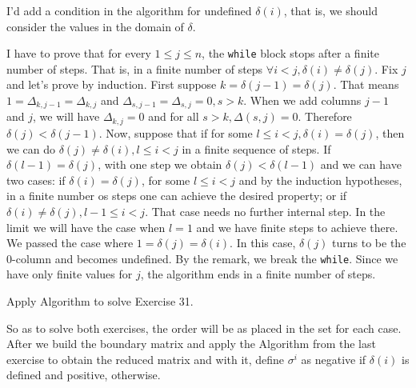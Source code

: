 \begin{remark}
    I'd add a condition in the algorithm for undefined $\delta(i)$, that is,
    we should consider the values in the domain of $\delta$.
\end{remark}

I have to prove that for every $1 \le j \le n$, the \texttt{while} block stops
after a finite number of steps. That is, in a finite number of steps $\forall
i < j, \delta(i) \neq \delta(j)$. Fix $j$ and let's prove by induction. First
suppose $k = \delta(j-1) = \delta(j)$. That means $1 = \Delta_{k,j-1} =
\Delta_{k,j}$ and $\Delta_{s,j-1} = \Delta_{s,j}=0, s > k$. When we add
columns $j-1$ and $j$, we will have $\Delta_{k,j} = 0$ and for all $s > k,
\Delta(s, j) = 0$. Therefore $\delta(j) < \delta(j-1)$. Now, suppose that if for
some $l \le i < j, \delta(i) = \delta(j)$,  then we can
do $\delta(j) \neq \delta(i), l \le i < j$ in a finite sequence of steps. If $\delta(l-1) = \delta(j)$, with one step we obtain $\delta(j) <
\delta(l-1)$ and we can have two cases: if $\delta(i) = \delta(j)$, for some
$l \le i < j$ and by the
induction hypotheses, in a finite number os steps one can achieve the desired
property; or if $\delta(i) \neq \delta(j), l-1 \le i < j$. That case needs no
further internal step. In the limit we will have the case when $l=1$ and we
have finite steps to achieve there. We passed the case where $1 = \delta(j) =
\delta(i)$. In this case, $\delta(j)$ turns to be the 0-column and becomes
undefined. By the remark, we break the \texttt{while}. Since we have only
finite values for $j$, the algorithm ends in a finite number of steps. 

\noindent\linia 

\begin{exercise}
    Apply Algorithm to solve Exercise 31.
\end{exercise}

So as to solve both exercises, the order will be as placed in the set for each
case.
After we build the boundary matrix and apply the Algorithm from the last
exercise to obtain the reduced matrix and with it, define $\sigma^i$ as negative
if $\delta(i)$ is defined and positive, otherwise. 

